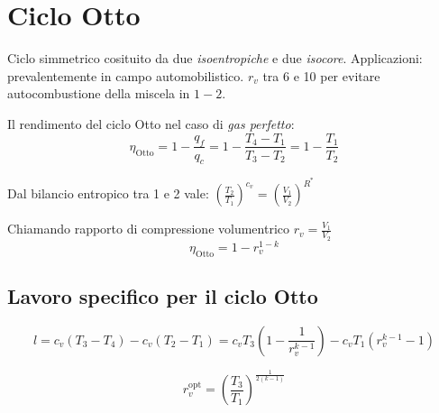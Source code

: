 \section{Ciclo Otto}
Ciclo simmetrico cosituito da due \emph{isoentropiche} e due \emph{isocore}.
Applicazioni: prevalentemente in campo automobilistico. $r_v$ tra 6 e 10 per evitare autocombustione della miscela in $1-2$.

\begin{minipage}{.5\linewidth}
\end{minipage}%
\begin{minipage}{.5\linewidth}
\end{minipage}

Il rendimento del ciclo Otto nel caso di \emph{gas perfetto}:
\[
    \eta_{\text{Otto}} = 1 - \frac{q_f}{q_c} = 1 - \frac{T_4-T_1}{T_3-T_2} = 1 - \frac{T_1}{T_2}
\]

Dal bilancio entropico tra 1 e 2 vale: $\left( \frac{T_2}{T_1} \right)^{c_v} = \left( \frac{V_1}{V_2} \right)^{R^*}$


Chiamando rapporto di compressione volumentrico $r_v = \frac{V_1}{V_2}$
\[
    \eta_{\text{Otto}} = 1 - r_v^{1-k}
\]

\subsection{Lavoro specifico per il ciclo Otto}

\[
    l = c_v(T_3-T_4) - c_v(T_2-T_1) = c_vT_3\left(1-\frac{1}{r_v^{k-1}}\right) - c_vT_1(r_v^{k-1}-1)
\]

\[
    r_v^{\text{opt}} = \left(\frac{T_3}{T_1}\right)^{\frac{1}{2(k-1)}}
\]
